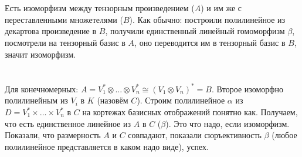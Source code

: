 \section{} %
Есть изоморфизм между тензорным произведением ($A$) и им же с переставленными множетелями ($B$).
Как обычно: построили полилинейное из декартова произведение в $B$, получили единственный линейный
гомоморфизм $\beta$, посмотрели на тензорный базис в $A$, оно переводится им в тензорный базис в $B$,
значит изоморфизм.

\section{} %
Для конечномерных: $A=V_1^* \otimes \dots \otimes V_n^* \cong (V_1 \otimes V_n)^*=B$.
Второе изоморфно полилинейным из $V_i$ в $K$ (назовём $C$).
Строим полилинейное $\alpha$ из $D=V_1^* \times \dots \times V_n^*$ в $C$ на кортежах базисных отображений понятно как.
Получаем, что есть единственное линейное из $A$ в $C$ ($\beta$).
Это что надо, если изоморфизм.
Показали, что размерность $A$ и $C$ совпадают, показали сюръективность $\beta$ (любое полилинейное
представляется в каком надо виде), успех.

